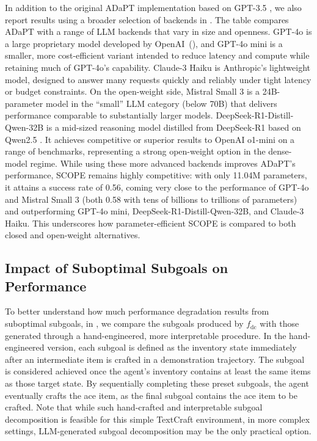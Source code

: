 In addition to the original ADaPT implementation based on GPT-3.5 \citep{BrownMRSSKD2020}, we also report results using a broader selection of backends in . The table compares ADaPT with a range of LLM backends that vary in size and openness. GPT-4o is a large proprietary model developed by OpenAI~(\citeyear{OpenAI2024}), and GPT-4o mini is a smaller, more cost-efficient variant intended to reduce latency and compute while retaining much of GPT-4o’s capability. Claude-3 Haiku \citep{anthropic_claude3_2024} is Anthropic’s lightweight model, designed to answer many requests quickly and reliably under tight latency or budget constraints. On the open-weight side, Mistral Small 3 \citep{mistral_small3_2025} is a 24B-parameter model in the ``small'' LLM category (below 70B) that delivers performance comparable to substantially larger models. DeepSeek-R1-Distill-Qwen-32B \citep{DeepSeek-AI2025} is a mid-sized reasoning model distilled from DeepSeek-R1 based on Qwen2.5 \citep{Qwen2024}. It achieves competitive or superior results to OpenAI o1-mini \citep{OpenAI2024-o1} on a range of benchmarks, representing a strong open-weight option in the dense-model regime. While using these more advanced backends improves ADaPT’s performance, SCOPE remains highly competitive: with only 11.04M parameters, it attains a success rate of 0.56, coming very close to the performance of GPT-4o and Mistral Small 3 (both 0.58 with tens of billions to trillions of parameters) and outperforming GPT-4o mini, DeepSeek-R1-Distill-Qwen-32B, and Claude-3 Haiku. This underscores how parameter-efficient SCOPE is compared to both closed and open-weight alternatives.

\subsection{Impact of Suboptimal Subgoals on Performance} 
\label{sec:impact_subopt_subgoal_performance}

To better understand how much performance degradation results from suboptimal subgoals, in , we compare the subgoals produced by \(f_{\text{dc}}\) with those generated through a hand-engineered, more interpretable procedure. In the hand-engineered version, each subgoal is defined as the inventory state immediately after an intermediate item is crafted in a demonstration trajectory. The subgoal is considered achieved once the agent's inventory contains at least the same items as those target state. By sequentially completing these preset subgoals, the agent eventually crafts the ace item, as the final subgoal contains the ace item to be crafted.  Note that while such hand-crafted and interpretable subgoal decomposition is feasible for this simple TextCraft environment, in more complex settings, LLM-generated subgoal decomposition may be the only practical option.


